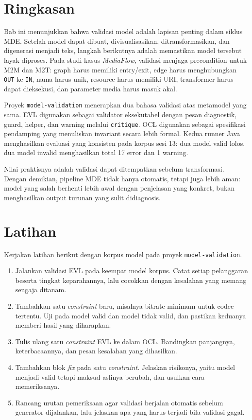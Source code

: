 \section{Ringkasan}

Bab ini menunjukkan bahwa validasi model adalah lapisan penting dalam siklus MDE. Setelah model dapat dibuat, divisualisasikan, ditransformasikan, dan digenerasi menjadi teks, langkah berikutnya adalah memastikan model tersebut layak diproses. Pada studi kasus \textit{MediaFlow}, validasi menjaga precondition untuk M2M dan M2T: graph harus memiliki entry/exit, edge harus menghubungkan \texttt{OUT} ke \texttt{IN}, nama harus unik, resource harus memiliki URI, transformer harus dapat dieksekusi, dan parameter media harus masuk akal.

Proyek \texttt{model-validation} menerapkan dua bahasa validasi atas metamodel yang sama. EVL digunakan sebagai validator eksekutabel dengan pesan diagnostik, guard, helper, dan warning melalui \texttt{critique}. OCL digunakan sebagai spesifikasi pendamping yang menuliskan invariant secara lebih formal. Kedua runner Java menghasilkan evaluasi yang konsisten pada korpus sesi 13: dua model valid lolos, dua model invalid menghasilkan total 17 error dan 1 warning.

Nilai praktisnya adalah validasi dapat ditempatkan sebelum transformasi. Dengan demikian, pipeline MDE tidak hanya otomatis, tetapi juga lebih aman: model yang salah berhenti lebih awal dengan penjelasan yang konkret, bukan menghasilkan output turunan yang sulit didiagnosis.

\section{Latihan}

Kerjakan latihan berikut dengan korpus model pada proyek \texttt{model-validation}.

\begin{enumerate}
  \item Jalankan validasi EVL pada keempat model korpus. Catat setiap pelanggaran beserta tingkat keparahannya, lalu cocokkan dengan kesalahan yang memang sengaja ditanam.
  \item Tambahkan satu \textit{constraint} baru, misalnya bitrate minimum untuk codec tertentu. Uji pada model valid dan model tidak valid, dan pastikan keduanya memberi hasil yang diharapkan.
  \item Tulis ulang satu \textit{constraint} EVL ke dalam OCL. Bandingkan panjangnya, keterbacaannya, dan pesan kesalahan yang dihasilkan.
  \item Tambahkan blok \textit{fix} pada satu \textit{constraint}. Jelaskan risikonya, yaitu model menjadi valid tetapi maksud aslinya berubah, dan usulkan cara memeriksanya.
  \item Rancang urutan pemeriksaan agar validasi berjalan otomatis sebelum generator dijalankan, lalu jelaskan apa yang harus terjadi bila validasi gagal.
\end{enumerate}


